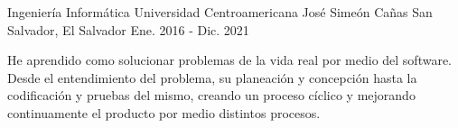 

\begin{cventries}

  \cventry
    {Ingeniería Informática} %
    {Universidad Centroamericana José Simeón Cañas} %
    {San Salvador, El Salvador} %
    {Ene. 2016 - Dic. 2021} %
    {
      \begin{cvitems} %
        \item {He aprendido como solucionar problemas de la vida real por medio del software. Desde el entendimiento del problema, su planeación y concepción hasta la codificación y pruebas del mismo, creando un proceso cíclico y mejorando continuamente el producto por medio distintos procesos.}
      \end{cvitems}
    }

\end{cventries}
